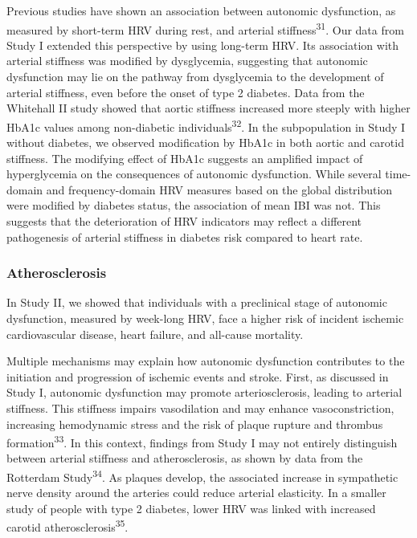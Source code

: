 \documentclass[
  a4paper,
  headsepline=true,
  open=any]{scrbook}
\begin{document}
Previous studies have shown an association between autonomic
dysfunction, as measured by short-term HRV during rest, and arterial
stiffness\textsuperscript{31}. Our data from Study I extended this
perspective by using long-term HRV. Its association with arterial
stiffness was modified by dysglycemia, suggesting that autonomic
dysfunction may lie on the pathway from dysglycemia to the development
of arterial stiffness, even before the onset of type 2 diabetes. Data
from the Whitehall II study showed that aortic stiffness increased more
steeply with higher HbA1c values among non-diabetic
individuals\textsuperscript{32}. In the subpopulation in Study I without
diabetes, we observed modification by HbA1c in both aortic and carotid
stiffness. The modifying effect of HbA1c suggests an amplified impact of
hyperglycemia on the consequences of autonomic dysfunction. While
several time-domain and frequency-domain HRV measures based on the
global distribution were modified by diabetes status, the association of
mean IBI was not. This suggests that the deterioration of HRV indicators
may reflect a different pathogenesis of arterial stiffness in diabetes
risk compared to heart rate.

\hypertarget{atherosclerosis-1}{%
\subsubsection{Atherosclerosis}\label{atherosclerosis-1}}

In Study II, we showed that individuals with a preclinical stage of
autonomic dysfunction, measured by week-long HRV, face a higher risk of
incident ischemic cardiovascular disease, heart failure, and all-cause
mortality.

Multiple mechanisms may explain how autonomic dysfunction contributes to
the initiation and progression of ischemic events and stroke. First, as
discussed in Study I, autonomic dysfunction may promote
arteriosclerosis, leading to arterial stiffness. This stiffness impairs
vasodilation and may enhance vasoconstriction, increasing hemodynamic
stress and the risk of plaque rupture and thrombus
formation\textsuperscript{33}. In this context, findings from Study I
may not entirely distinguish between arterial stiffness and
atherosclerosis, as shown by data from the Rotterdam
Study\textsuperscript{34}. As plaques develop, the associated increase
in sympathetic nerve density around the arteries could reduce arterial
elasticity. In a smaller study of people with type 2 diabetes, lower HRV
was linked with increased carotid atherosclerosis\textsuperscript{35}.
\end{document}
